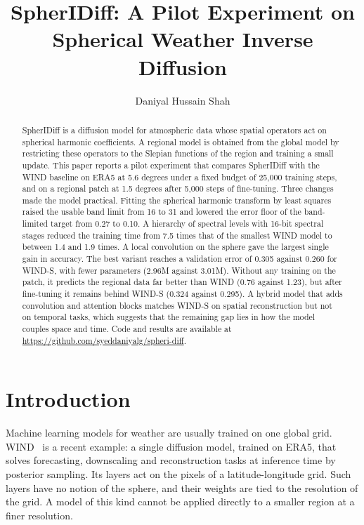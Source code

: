 \documentclass{article}
\title{SpherIDiff: A Pilot Experiment on Spherical Weather Inverse Diffusion}
\author{
  Daniyal Hussain Shah
}
\begin{document}
\maketitle

\begin{abstract}
SpherIDiff is a diffusion model for atmospheric data whose spatial operators act on spherical harmonic coefficients. A regional model is obtained from the global model by restricting these operators to the Slepian functions of the region and training a small update. This paper reports a pilot experiment that compares SpherIDiff with the WIND baseline on ERA5 at 5.6 degrees under a fixed budget of 25,000 training steps, and on a regional patch at 1.5 degrees after 5,000 steps of fine-tuning. Three changes made the model practical. Fitting the spherical harmonic transform by least squares raised the usable band limit from 16 to 31 and lowered the error floor of the band-limited target from 0.27 to 0.10. A hierarchy of spectral levels with 16-bit spectral stages reduced the training time from 7.5 times that of the smallest WIND model to between 1.4 and 1.9 times. A local convolution on the sphere gave the largest single gain in accuracy. The best variant reaches a validation error of 0.305 against 0.260 for WIND-S, with fewer parameters (2.96M against 3.01M). Without any training on the patch, it predicts the regional data far better than WIND (0.76 against 1.23), but after fine-tuning it remains behind WIND-S (0.324 against 0.295). A hybrid model that adds convolution and attention blocks matches WIND-S on spatial reconstruction but not on temporal tasks, which suggests that the remaining gap lies in how the model couples space and time. Code and results are available at \url{https://github.com/syeddaniyalg/spheri-diff}.
\end{abstract}

\section{Introduction}

Machine learning models for weather are usually trained on one global grid. WIND~\citep{aich2026wind} is a recent example: a single diffusion model, trained on ERA5, that solves forecasting, downscaling and reconstruction tasks at inference time by posterior sampling. Its layers act on the pixels of a latitude-longitude grid. Such layers have no notion of the sphere, and their weights are tied to the resolution of the grid. A model of this kind cannot be applied directly to a smaller region at a finer resolution.
\end{document}
